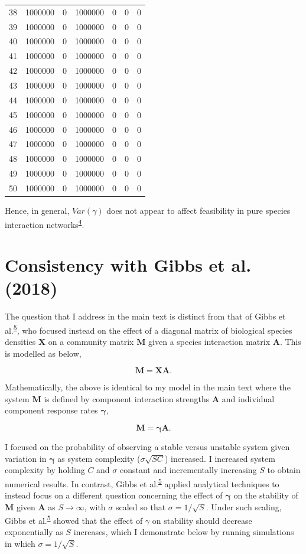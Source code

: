 \documentclass[]{article}
\begin{document}
\begin{longtable}[]{@{}rrrrrrr@{}}
38 & 1000000 & 0 & 1000000 & 0 & 0 & 0\tabularnewline
39 & 1000000 & 0 & 1000000 & 0 & 0 & 0\tabularnewline
40 & 1000000 & 0 & 1000000 & 0 & 0 & 0\tabularnewline
41 & 1000000 & 0 & 1000000 & 0 & 0 & 0\tabularnewline
42 & 1000000 & 0 & 1000000 & 0 & 0 & 0\tabularnewline
43 & 1000000 & 0 & 1000000 & 0 & 0 & 0\tabularnewline
44 & 1000000 & 0 & 1000000 & 0 & 0 & 0\tabularnewline
45 & 1000000 & 0 & 1000000 & 0 & 0 & 0\tabularnewline
46 & 1000000 & 0 & 1000000 & 0 & 0 & 0\tabularnewline
47 & 1000000 & 0 & 1000000 & 0 & 0 & 0\tabularnewline
48 & 1000000 & 0 & 1000000 & 0 & 0 & 0\tabularnewline
49 & 1000000 & 0 & 1000000 & 0 & 0 & 0\tabularnewline
50 & 1000000 & 0 & 1000000 & 0 & 0 & 0\tabularnewline
\bottomrule
\end{longtable}

Hence, in general, \(Var(\gamma)\) does not appear to affect feasibility
in pure species interaction
networks\textsuperscript{\protect\hyperlink{ref-Servan2018}{4}}.

\hypertarget{Gibbs}{%
\section{Consistency with Gibbs et al. (2018)}\label{Gibbs}}

The question that I address in the main text is distinct from that of
Gibbs et al.\textsuperscript{\protect\hyperlink{ref-Gibbs2017}{5}}, who
focused instead on the effect of a diagonal matrix of biological species
densities \(\mathbf{X}\) on a community matrix \(\mathbf{M}\) given a
species interaction matrix \(\mathbf{A}\). This is modelled as below,

\[\mathbf{M} = \mathbf{XA}.\]

Mathematically, the above is identical to my model in the main text
where the system \(\mathbf{M}\) is defined by component interaction
strengths \(\mathbf{A}\) and individual component response rates
\(\mathbf{\gamma}\),

\[\mathbf{M} = \mathbf{\gamma A}.\]

I focused on the probability of observing a stable versus unstable
system given variation in \(\mathbf{\gamma}\) as system complexity
(\(\sigma\sqrt{SC}\)) increased. I increased system complexity by
holding \(C\) and \(\sigma\) constant and incrementally increasing \(S\)
to obtain numerical results. In contrast, Gibbs et
al.\textsuperscript{\protect\hyperlink{ref-Gibbs2017}{5}} applied
analytical techniques to instead focus on a different question
concerning the effect of \(\mathbf{\gamma}\) on the stability of
\(\mathbf{M}\) given \(\mathbf{A}\) as \(S \to \infty\), with \(\sigma\)
scaled so that \(\sigma = 1/\sqrt{S}\). Under such scaling, Gibbs et
al.\textsuperscript{\protect\hyperlink{ref-Gibbs2017}{5}} showed that
the effect of \(\gamma\) on stability should decrease exponentially as
\(S\) increases, which I demonstrate below by running simulations in
which \(\sigma = 1/\sqrt{S}\).
\end{document}
